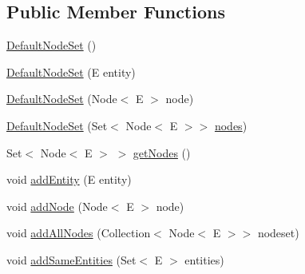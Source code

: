 \subsection*{Public Member Functions}
\begin{DoxyCompactItemize}
\item 
\hyperlink{classorg_1_1semanticweb_1_1owlapi_1_1reasoner_1_1impl_1_1_default_node_set_3_01_e_01extends_01_o_w_l_object_01_4_a6fee054065da07894515e6b0e4a0594e}{Default\-Node\-Set} ()
\item 
\hyperlink{classorg_1_1semanticweb_1_1owlapi_1_1reasoner_1_1impl_1_1_default_node_set_3_01_e_01extends_01_o_w_l_object_01_4_a95d23d586a6fcccd6b492c9422076e79}{Default\-Node\-Set} (E entity)
\item 
\hyperlink{classorg_1_1semanticweb_1_1owlapi_1_1reasoner_1_1impl_1_1_default_node_set_3_01_e_01extends_01_o_w_l_object_01_4_a0638b81c02265acbe5e05cf47856623b}{Default\-Node\-Set} (Node$<$ E $>$ node)
\item 
\hyperlink{classorg_1_1semanticweb_1_1owlapi_1_1reasoner_1_1impl_1_1_default_node_set_3_01_e_01extends_01_o_w_l_object_01_4_ab9df277461c487dbe790fe9c49d0067f}{Default\-Node\-Set} (Set$<$ Node$<$ E $>$$>$ \hyperlink{classorg_1_1semanticweb_1_1owlapi_1_1reasoner_1_1impl_1_1_default_node_set_3_01_e_01extends_01_o_w_l_object_01_4_ab355a8f9ba4d122cad825fd36214893e}{nodes})
\item 
Set$<$ Node$<$ E $>$ $>$ \hyperlink{classorg_1_1semanticweb_1_1owlapi_1_1reasoner_1_1impl_1_1_default_node_set_3_01_e_01extends_01_o_w_l_object_01_4_a7f7f94c7cbc0e906eb2b86d569416988}{get\-Nodes} ()
\item 
void \hyperlink{classorg_1_1semanticweb_1_1owlapi_1_1reasoner_1_1impl_1_1_default_node_set_3_01_e_01extends_01_o_w_l_object_01_4_a41ee9f5500bbfdc643b75f21d1a2a2e0}{add\-Entity} (E entity)
\item 
void \hyperlink{classorg_1_1semanticweb_1_1owlapi_1_1reasoner_1_1impl_1_1_default_node_set_3_01_e_01extends_01_o_w_l_object_01_4_a25c6dda0fe0abad7c56eb63c273917dd}{add\-Node} (Node$<$ E $>$ node)
\item 
void \hyperlink{classorg_1_1semanticweb_1_1owlapi_1_1reasoner_1_1impl_1_1_default_node_set_3_01_e_01extends_01_o_w_l_object_01_4_ad7bc331bab54991a2751efd5d438296a}{add\-All\-Nodes} (Collection$<$ Node$<$ E $>$$>$ nodeset)
\item 
void \hyperlink{classorg_1_1semanticweb_1_1owlapi_1_1reasoner_1_1impl_1_1_default_node_set_3_01_e_01extends_01_o_w_l_object_01_4_a3ac6cb857213a9a8b6c1f4954bc18ec4}{add\-Same\-Entities} (Set$<$ E $>$ entities)

\end{DoxyCompactItemize}
